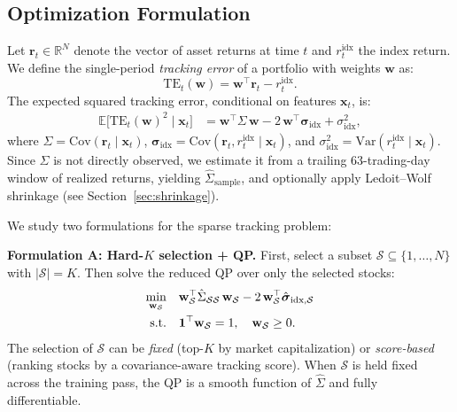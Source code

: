 \documentclass[11pt]{article}
\begin{document}
\subsection{Optimization Formulation}

Let $\mathbf{r}_t \in \mathbb{R}^N$ denote the vector of asset returns at time $t$ and $r_t^{\mathrm{idx}}$ the index return. We define the single-period \emph{tracking error} of a portfolio with weights $\mathbf{w}$ as:
\[
  \mathrm{TE}_t(\mathbf{w}) = \mathbf{w}^\top \mathbf{r}_t - r_t^{\mathrm{idx}}.
\]
The expected squared tracking error, conditional on features $\mathbf{x}_t$, is:
\begin{align}
  \mathbb{E}\bigl[\mathrm{TE}_t(\mathbf{w})^2 \mid \mathbf{x}_t\bigr]
    &= \mathbf{w}^\top \Sigma \, \mathbf{w}
      - 2\,\mathbf{w}^\top \boldsymbol{\sigma}_{\mathrm{idx}}
      + \sigma_{\mathrm{idx}}^2, \label{eq:te-expansion}
\end{align}
where $\Sigma = \mathrm{Cov}(\mathbf{r}_t \mid \mathbf{x}_t)$, $\boldsymbol{\sigma}_{\mathrm{idx}} = \mathrm{Cov}(\mathbf{r}_t, r_t^{\mathrm{idx}} \mid \mathbf{x}_t)$, and $\sigma_{\mathrm{idx}}^2 = \mathrm{Var}(r_t^{\mathrm{idx}} \mid \mathbf{x}_t)$.  Since $\Sigma$ is not directly observed, we estimate it from a trailing 63-trading-day window of realized returns, yielding $\hat{\Sigma}_{\mathrm{sample}}$, and optionally apply Ledoit--Wolf shrinkage (see Section~\ref{sec:shrinkage}).

We study two formulations for the sparse tracking problem:

\textbf{Formulation A: Hard-$K$ selection + QP.}\; First, select a subset $\mathcal{S} \subseteq \{1,\dots,N\}$ with $|\mathcal{S}| = K$. Then solve the reduced QP over only the selected stocks:
\begin{align}
  \min_{\mathbf{w}_\mathcal{S}} \quad & \mathbf{w}_\mathcal{S}^\top \hat{\Sigma}_{\mathcal{S}\mathcal{S}}\, \mathbf{w}_\mathcal{S}
    - 2\,\mathbf{w}_\mathcal{S}^\top \hat{\boldsymbol{\sigma}}_{\mathrm{idx},\mathcal{S}}
    \label{eq:hard-k}\\
  \text{s.t.} \quad & \mathbf{1}^\top \mathbf{w}_\mathcal{S} = 1, \quad
    \mathbf{w}_\mathcal{S} \geq 0. \notag
\end{align}
The selection of $\mathcal{S}$ can be \emph{fixed} (top-$K$ by market capitalization) or \emph{score-based} (ranking stocks by a covariance-aware tracking score). When $\mathcal{S}$ is held fixed across the training pass, the QP is a smooth function of $\hat{\Sigma}$ and fully differentiable.
\end{document}
